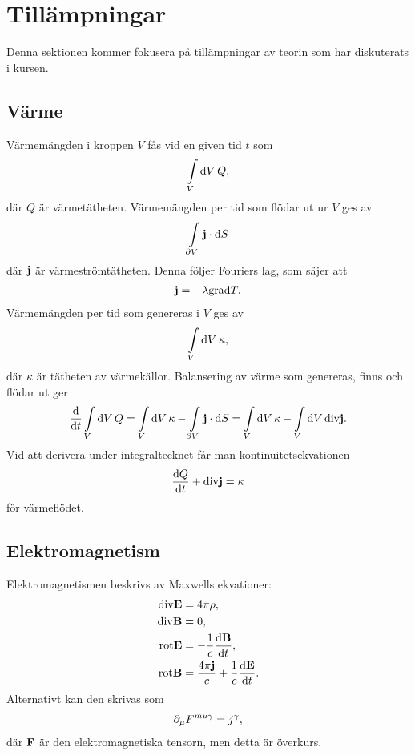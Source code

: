 \section{Tillämpningar}

Denna sektionen kommer fokusera på tillämpningar av teorin som har diskuterats i kursen.

\subsection{Värme}
Värmemängden i kroppen $V$ fås vid en given tid $t$ som
\begin{align*}
	\int\limits_{V}\dd{V}Q,
\end{align*}
där $Q$ är värmetätheten. Värmemängden per tid som flödar ut ur $V$ ges av
\begin{align*}
	\int\limits_{\partial V}\vb{j}\cdot\dd{S}
\end{align*}
där $\vb{j}$ är värmeströmtätheten. Denna följer Fouriers lag, som säjer att
\begin{align*}
	\vb{j} = -\lambda\text{grad}T.
\end{align*}
Värmemängden per tid som genereras i $V$ ges av
\begin{align*}
	\int\limits_{V}\dd{V}\kappa,
\end{align*}
där $\kappa$ är tätheten av värmekällor. Balansering av värme som genereras, finns och flödar ut ger
\begin{align*}
	\dv{t}\int\limits_{V}\dd{V}Q = \int\limits_{V}\dd{V}\kappa - \int\limits_{\partial V}\vb{j}\cdot\dd{S} = \int\limits_{V}\dd{V}\kappa - \int\limits_{V}\dd{V}\text{div}\vb{j}.
\end{align*}
Vid att derivera under integraltecknet får man kontinuitetsekvationen
\begin{align*}
	\dv{Q}{t} + \text{div}\vb{j} = \kappa
\end{align*}
för värmeflödet.

\subsection{Elektromagnetism}
Elektromagnetismen beskrivs av Maxwells ekvationer:
\begin{align*}
	\text{div}\vb{E}  &= 4\pi\rho, \\
	\text{div}\vb{B}  &= 0, \\
	\text{rot}\vb{E} &= -\frac{1}{c}\dv{\vb{B}}{t}, \\
	\text{rot}\vb{B} &= \frac{4\pi\vb{j}}{c} + \frac{1}{c}\dv{\vb{E}}{t}.
\end{align*}
Alternativt kan den skrivas som
\begin{align*}
	\partial_{\mu}F^{mu\gamma} = j^{\gamma},
\end{align*}
där $\vb{F}$ är den elektromagnetiska tensorn, men detta är överkurs.